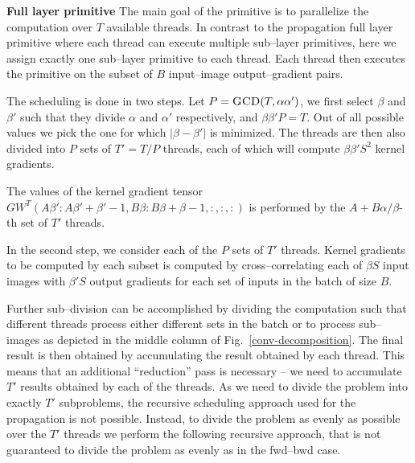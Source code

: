   {\bf Full layer primitive} \quad The main goal of the primitive is
  to parallelize the computation over $T$ available threads.  In
  contrast to the propagation full layer primitive where each thread can
  execute multiple sub--layer primitives, here we assign exactly one
  sub--layer primitive to each thread.  Each thread then executes the
  primitive on the subset of $B$ input--image output--gradient pairs.

  The scheduling is done in two steps.  Let $P =
  \textnormal{\scshape GCD}(T,\alpha\alpha')$, we first select $\beta$ and $\beta'$
  such that they divide $\alpha$ and $\alpha'$ respectively, and
  $\beta\beta'P = T$.  Out of all possible values we pick the one for
  which $|\beta -\beta'|$ is minimized.  The threads are then also
  divided into $P$ sets of $T'=T/P$ threads, each of which will
  compute $\beta\beta'S^2$ kernel gradients.

  The values of the kernel gradient tensor $GW^T(A
  \beta':A\beta'+\beta'-1,B \beta: B\beta + \beta-1, :,:,:)$ is
  performed by the $A + B \alpha / \beta$-th set of $T'$ threads.

  In the second step, we consider each of the $P$ sets of $T'$
  threads.  Kernel gradients to be computed by each subset is computed
  by cross--correlating each of $\beta S$ input images with $\beta'S$
  output gradients for each set of inputs in the batch of size $B$.

  Further sub--division can be accomplished by dividing the
  computation such that different threads process either different
  sets in the batch or to process sub--images as depicted in the
  middle column of Fig.~\ref{conv-decomposition}.  The final result is
  then obtained by accumulating the result obtained by each thread.
  This means that an additional ``reduction'' pass is necessary -- we
  need to accumulate $T'$ results obtained by each of the threads.  As
  we need to divide the problem into exactly $T'$ subproblems, the
  recursive scheduling approach used for the propagation is not
  possible.  Instead, to divide the problem as evenly as possible over
  the $T'$ threads we perform the following recursive approach, that
  is not guaranteed to divide the problem as evenly as in the fwd--bwd
  case.
